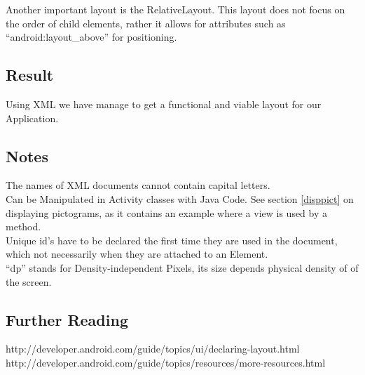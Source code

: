 Another important layout is the RelativeLayout. 
This layout does not focus on the order of child elements, rather it allows for attributes such as ``android:layout\_above'' for positioning.

\subsection*{Result}

Using XML we have manage to get a functional and viable layout for our Application.

\subsection*{Notes}
The names of XML documents cannot contain capital letters.\\
Can be Manipulated in Activity classes with Java Code.
See section \ref{disppict} on displaying pictograms, as it contains an example where a view is used by a method.\\
Unique id's have to be declared the first time they are used in the document, which not necessarily when they are attached to an Element.\\
``dp'' stands for Density-independent Pixels, its size depends physical density of of the screen.

\subsection*{Further Reading}
http://developer.android.com/guide/topics/ui/declaring-layout.html\\
http://developer.android.com/guide/topics/resources/more-resources.html\\